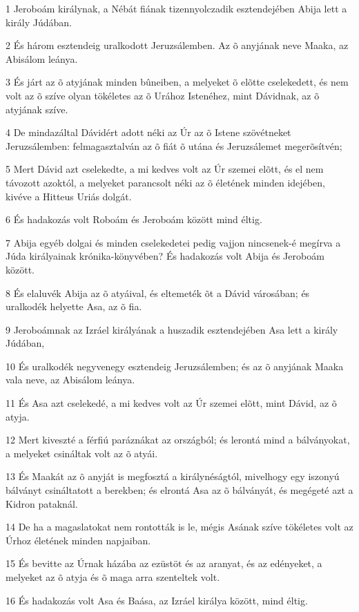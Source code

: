 \par 1 Jeroboám királynak, a Nébát fiának tizennyolczadik esztendejében Abija lett a király Júdában.
\par 2 És három esztendeig uralkodott Jeruzsálemben. Az õ anyjának neve Maaka, az Abisálom leánya.
\par 3 És járt az õ atyjának minden bûneiben, a melyeket õ elõtte cselekedett, és nem volt az õ szíve olyan tökéletes az õ Urához Istenéhez, mint Dávidnak, az õ atyjának szíve.
\par 4 De mindazáltal Dávidért adott néki az Úr az õ Istene szövétneket Jeruzsálemben: felmagasztalván az õ fiát õ utána és Jeruzsálemet megerõsítvén;
\par 5 Mert Dávid azt cselekedte, a mi kedves volt az Úr szemei elõtt, és el nem távozott azoktól, a melyeket parancsolt néki az õ életének minden idejében, kivéve a Hitteus Uriás dolgát.
\par 6 És hadakozás volt Roboám és Jeroboám között mind éltig.
\par 7 Abija egyéb dolgai és minden cselekedetei pedig vajjon nincsenek-é megírva a Júda királyainak krónika-könyvében? És hadakozás volt Abija és Jeroboám között.
\par 8 És elaluvék Abija az õ atyáival, és eltemeték õt a Dávid városában; és uralkodék helyette Asa, az õ fia.
\par 9 Jeroboámnak az Izráel királyának a huszadik esztendejében Asa lett a király Júdában,
\par 10 És uralkodék negyvenegy esztendeig Jeruzsálemben; és az õ anyjának Maaka vala neve, az Abisálom leánya.
\par 11 És Asa azt cselekedé, a mi kedves volt az Úr szemei elõtt, mint Dávid, az õ atyja.
\par 12 Mert kiveszté a férfiú paráznákat az  országból; és lerontá mind a bálványokat, a melyeket csináltak volt az õ atyái.
\par 13 És Maakát az õ anyját is megfosztá a királynéságtól, mivelhogy egy iszonyú bálványt csináltatott a berekben; és elrontá Asa az õ bálványát, és megégeté  azt a Kidron pataknál.
\par 14 De ha a magaslatokat nem rontották is le, mégis Asának szíve tökéletes volt az Úrhoz életének minden napjaiban.
\par 15 És bevitte az Úrnak házába az ezüstöt és az aranyat, és az edényeket, a melyeket az õ atyja és õ maga arra szenteltek volt.
\par 16 És hadakozás volt Asa és Baása, az Izráel királya között, mind éltig.
